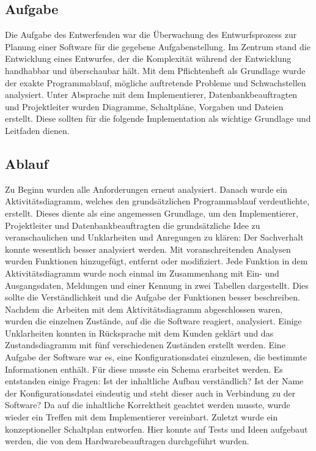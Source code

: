 \subsection{Aufgabe}
Die Aufgabe des Entwerfenden war die Überwachung des Entwurfsprozess zur Planung einer Software für die gegebene Aufgabenstellung. Im Zentrum stand die Entwicklung eines Entwurfes, der die Komplexität während der Entwicklung handhabbar und überschaubar hält. Mit dem Pflichtenheft als Grundlage wurde der exakte Programmablauf, mögliche auftretende Probleme und Schwachstellen analysiert. Unter Absprache mit dem Implementierer, Datenbankbeauftragten und Projektleiter wurden Diagramme, Schaltpläne, Vorgaben und Dateien erstellt. Diese sollten für die folgende Implementation als wichtige Grundlage und Leitfaden dienen.

\subsection{Ablauf}
Zu Beginn wurden alle Anforderungen erneut analysiert. Danach wurde ein Aktivitätsdiagramm, welches den grundsätzlichen Programmablauf verdeutlichte, erstellt. Dieses diente als eine angemessen Grundlage, um den Implementierer,  Projektleiter und Datenbankbeauftragten die grundsätzliche Idee zu veranschaulichen und Unklarheiten und Anregungen zu klären: Der  Sachverhalt konnte wesentlich besser analysiert werden. Mit voranschreitenden Analysen wurden Funktionen hinzugefügt, entfernt oder modifiziert. Jede Funktion in dem Aktivitätsdiagramm wurde noch einmal im Zusammenhang mit Ein- und Ausgangsdaten, Meldungen und einer Kennung in zwei Tabellen dargestellt. Dies sollte die Verständlichkeit und die Aufgabe der Funktionen besser beschreiben. Nachdem die Arbeiten mit dem Aktivitätsdiagramm abgeschlossen waren, wurden die einzelnen Zustände, auf die die Software reagiert, analysiert. Einige Unklarheiten konnten in Rücksprache mit dem Kunden geklärt und das Zustandsdiagramm mit fünf verschiedenen Zuständen erstellt werden. Eine Aufgabe der Software war es, eine Konfigurationsdatei einzulesen, die bestimmte Informationen enthält. Für diese musste ein Schema erarbeitet werden. Es entstanden einige Fragen: Ist der inhaltliche Aufbau verständlich? Ist der Name der Konfigurationsdatei eindeutig und steht dieser auch in Verbindung zu der Software? Da auf die inhaltliche Korrektheit geachtet werden musste, wurde wieder ein Treffen mit dem Implementierer vereinbart. Zuletzt wurde ein konzeptioneller Schaltplan entworfen. Hier konnte auf Tests und Ideen aufgebaut werden, die von dem Hardwarebeauftragen durchgeführt wurden.

